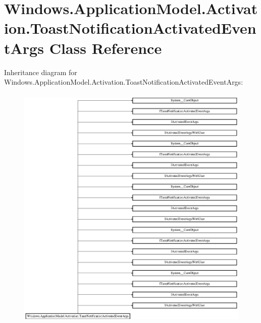 \hypertarget{class_windows_1_1_application_model_1_1_activation_1_1_toast_notification_activated_event_args}{}\section{Windows.\+Application\+Model.\+Activation.\+Toast\+Notification\+Activated\+Event\+Args Class Reference}
\label{class_windows_1_1_application_model_1_1_activation_1_1_toast_notification_activated_event_args}
Inheritance diagram for Windows.\+Application\+Model.\+Activation.\+Toast\+Notification\+Activated\+Event\+Args\+:\begin{figure}[H]
\begin{center}
\leavevmode
\includegraphics[height=12.000000cm]{class_windows_1_1_application_model_1_1_activation_1_1_toast_notification_activated_event_args}
\end{center}
\end{figure}
